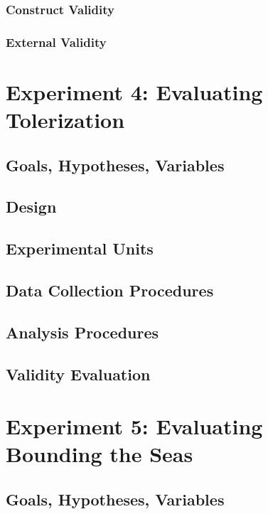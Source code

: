 \documentclass[10pt,nocc]{xrese_report}
\begin{document}
\subsubsection*{Construct Validity}

\subsubsection*{External Validity}

\section{Experiment 4: Evaluating Tolerization}

\subsection{Goals, Hypotheses, Variables}

\subsection{Design}

\subsection{Experimental Units}

\subsection{Data Collection Procedures}

\subsection{Analysis Procedures}

\subsection{Validity Evaluation}

\section{Experiment 5: Evaluating Bounding the Seas}

\subsection{Goals, Hypotheses, Variables}
\end{document}
